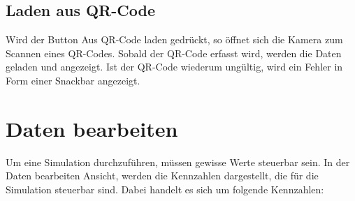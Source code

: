 		\subsection{Laden aus QR-Code}
		\label{subsec:load-qr}
		Wird der Button \glqq Aus QR-Code laden\grqq{} gedrückt, so öffnet sich die Kamera zum Scannen eines QR-Codes. Sobald der QR-Code erfasst wird, werden die Daten geladen und angezeigt. Ist der QR-Code wiederum ungültig, wird ein Fehler in Form einer Snackbar angezeigt.

	\section{Daten bearbeiten}
	
	Um eine Simulation durchzuführen, müssen gewisse Werte steuerbar sein. In der Daten bearbeiten Ansicht, werden die Kennzahlen dargestellt, die für die Simulation steuerbar sind. Dabei handelt es sich um folgende Kennzahlen:
	
